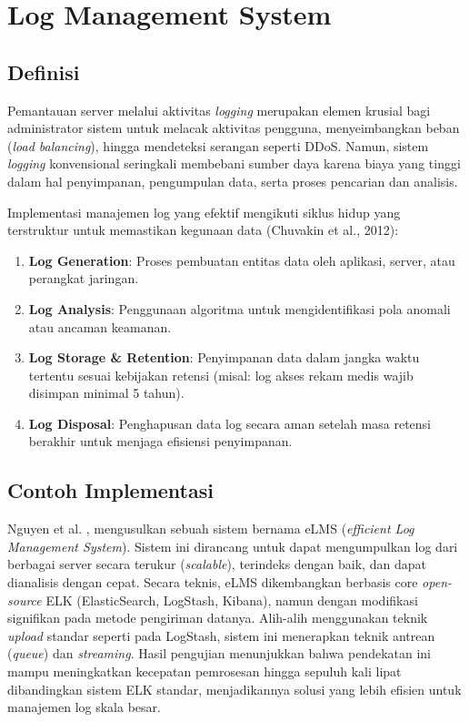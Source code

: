 \section{Log Management System}

\subsection{Definisi}
Pemantauan server melalui aktivitas \textit{logging} merupakan elemen krusial bagi administrator sistem untuk melacak aktivitas pengguna, menyeimbangkan beban (\textit{load balancing}), hingga mendeteksi serangan seperti DDoS. Namun, sistem \textit{logging} konvensional seringkali membebani sumber daya karena biaya yang tinggi dalam hal penyimpanan, pengumpulan data, serta proses pencarian dan analisis.

Implementasi manajemen log yang efektif mengikuti siklus hidup yang terstruktur untuk memastikan kegunaan data (Chuvakin et al., 2012):
\begin{enumerate}
    \item \textbf{Log Generation}: Proses pembuatan entitas data oleh aplikasi, server, atau perangkat jaringan.
    \item \textbf{Log Analysis}: Penggunaan algoritma untuk mengidentifikasi pola anomali atau ancaman keamanan.
    \item \textbf{Log Storage \& Retention}: Penyimpanan data dalam jangka waktu tertentu sesuai kebijakan retensi (misal: log akses rekam medis wajib disimpan minimal 5 tahun).
    \item \textbf{Log Disposal}: Penghapusan data log secara aman setelah masa retensi berakhir untuk menjaga efisiensi penyimpanan.
\end{enumerate}

\subsection{Contoh Implementasi}
Nguyen et al. \cite{18}, mengusulkan sebuah sistem bernama eLMS (\textit{efficient Log Management System}). Sistem ini dirancang untuk dapat mengumpulkan log dari berbagai server secara terukur (\textit{scalable}), terindeks dengan baik, dan dapat dianalisis dengan cepat. Secara teknis, eLMS dikembangkan berbasis core \textit{open-source} ELK (ElasticSearch, LogStash, Kibana), namun dengan modifikasi signifikan pada metode pengiriman datanya. Alih-alih menggunakan teknik \textit{upload} standar seperti pada LogStash, sistem ini menerapkan teknik antrean (\textit{queue}) dan \textit{streaming}. Hasil pengujian menunjukkan bahwa pendekatan ini mampu meningkatkan kecepatan pemrosesan hingga sepuluh kali lipat dibandingkan sistem ELK standar, menjadikannya solusi yang lebih efisien untuk manajemen log skala besar.